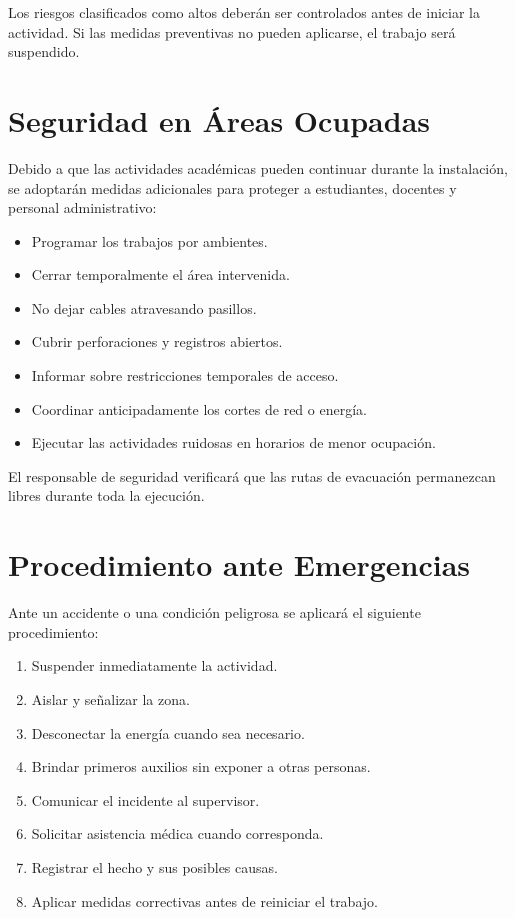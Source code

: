 Los riesgos clasificados como altos deberán ser controlados antes de iniciar la actividad. Si las medidas preventivas no pueden aplicarse, el trabajo será suspendido.

\section{Seguridad en Áreas Ocupadas}

Debido a que las actividades académicas pueden continuar durante la instalación, se adoptarán medidas adicionales para proteger a estudiantes, docentes y personal administrativo:

\begin{itemize}
    \item Programar los trabajos por ambientes.
    \item Cerrar temporalmente el área intervenida.
    \item No dejar cables atravesando pasillos.
    \item Cubrir perforaciones y registros abiertos.
    \item Informar sobre restricciones temporales de acceso.
    \item Coordinar anticipadamente los cortes de red o energía.
    \item Ejecutar las actividades ruidosas en horarios de menor ocupación.
\end{itemize}

El responsable de seguridad verificará que las rutas de evacuación permanezcan libres durante toda la ejecución.

\section{Procedimiento ante Emergencias}

Ante un accidente o una condición peligrosa se aplicará el siguiente procedimiento:

\begin{enumerate}
    \item Suspender inmediatamente la actividad.
    \item Aislar y señalizar la zona.
    \item Desconectar la energía cuando sea necesario.
    \item Brindar primeros auxilios sin exponer a otras personas.
    \item Comunicar el incidente al supervisor.
    \item Solicitar asistencia médica cuando corresponda.
    \item Registrar el hecho y sus posibles causas.
    \item Aplicar medidas correctivas antes de reiniciar el trabajo.
\end{enumerate}

